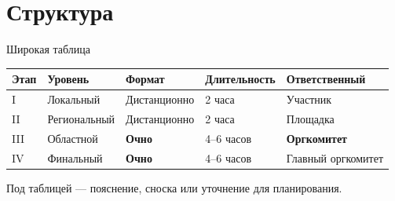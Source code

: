 \section{Структура}

\begin{frame}{Широкая таблица}
  \vspace{0.2em}
  \small
  \begin{tabular}{@{}p{}p{}p{}p{}p{}@{}}
    \toprule
    \textbf{Этап} & \textbf{Уровень} & \textbf{Формат} & \textbf{Длительность} & \textbf{Ответственный}\\
    \midrule
    I   & Локальный     & Дистанционно & 2 часа & Участник \\
    \addlinespace[0.3em]
    II  & Региональный  & Дистанционно & 2 часа & Площадка \\
    \addlinespace[0.3em]
    III & Областной     & \textbf{Очно} & 4--6 часов & \textbf{Оргкомитет} \\
    \addlinespace[0.3em]
    IV  & Финальный     & \textbf{Очно} & 4--6 часов & Главный оргкомитет \\
    \bottomrule
  \end{tabular}

  \vspace{0.9em}
  {\footnotesize\color{acGray}
  Под таблицей --- пояснение, сноска или уточнение для планирования.}
\end{frame}
